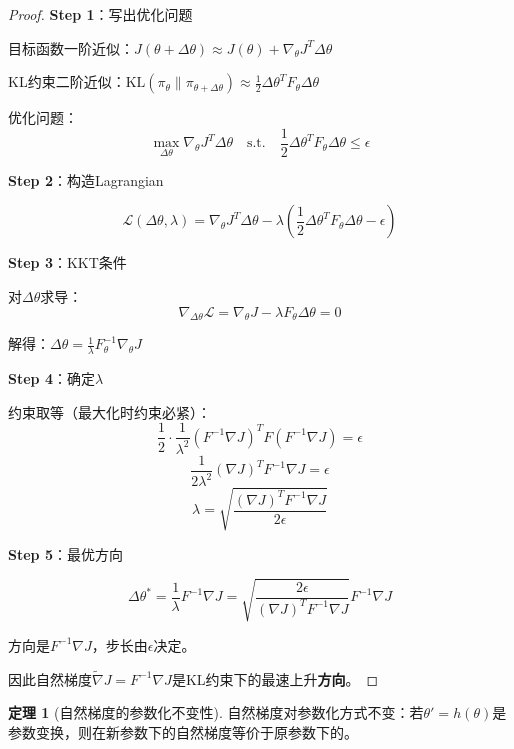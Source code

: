 \documentclass[11pt,a4paper]{article}
\theoremstyle{definition}
\newtheorem{theorem}{定理}[section]
\begin{document}
\begin{proof}
\textbf{Step 1}：写出优化问题

目标函数一阶近似：$J(\theta + \Delta\theta) \approx J(\theta) + \nabla_\theta J^T \Delta\theta$

KL约束二阶近似：$\text{KL}(\pi_\theta \| \pi_{\theta+\Delta\theta}) \approx \frac{1}{2}\Delta\theta^T F_\theta \Delta\theta$

优化问题：
\[
\max_{\Delta\theta} \nabla_\theta J^T \Delta\theta \quad \text{s.t.} \quad \frac{1}{2}\Delta\theta^T F_\theta \Delta\theta \leq \epsilon
\]

\textbf{Step 2}：构造Lagrangian

\[
\mathcal{L}(\Delta\theta, \lambda) = \nabla_\theta J^T \Delta\theta - \lambda\left(\frac{1}{2}\Delta\theta^T F_\theta \Delta\theta - \epsilon\right)
\]

\textbf{Step 3}：KKT条件

对$\Delta\theta$求导：
\[
\nabla_{\Delta\theta} \mathcal{L} = \nabla_\theta J - \lambda F_\theta \Delta\theta = 0
\]

解得：$\Delta\theta = \frac{1}{\lambda} F_\theta^{-1} \nabla_\theta J$

\textbf{Step 4}：确定$\lambda$

约束取等（最大化时约束必紧）：
\[
\frac{1}{2} \cdot \frac{1}{\lambda^2} (F^{-1}\nabla J)^T F (F^{-1}\nabla J) = \epsilon
\]
\[
\frac{1}{2\lambda^2} (\nabla J)^T F^{-1} \nabla J = \epsilon
\]
\[
\lambda = \sqrt{\frac{(\nabla J)^T F^{-1} \nabla J}{2\epsilon}}
\]

\textbf{Step 5}：最优方向

\[
\Delta\theta^* = \frac{1}{\lambda} F^{-1} \nabla J = \sqrt{\frac{2\epsilon}{(\nabla J)^T F^{-1} \nabla J}} F^{-1} \nabla J
\]

方向是$F^{-1} \nabla J$，步长由$\epsilon$决定。

因此自然梯度$\tilde{\nabla} J = F^{-1} \nabla J$是KL约束下的最速上升\textbf{方向}。
\end{proof}

\begin{theorem}[自然梯度的参数化不变性]
自然梯度对参数化方式不变：若$\theta' = h(\theta)$是参数变换，则在新参数下的自然梯度等价于原参数下的。
\end{theorem}
\end{document}
